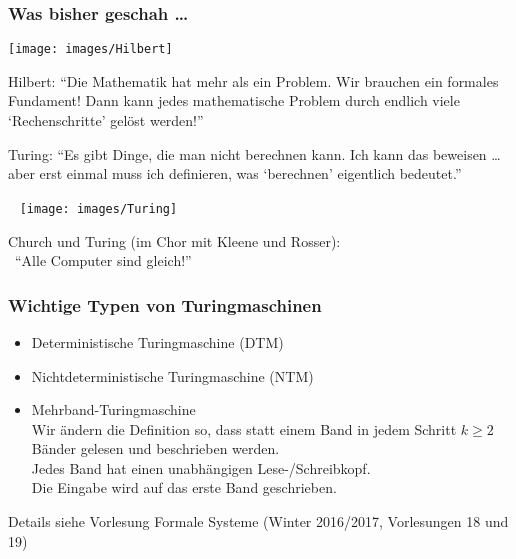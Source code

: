 \documentclass[onlymath]{beamer}
\begin{document}
\maketitle

\begin{frame}\frametitle{Was bisher geschah \ldots}\label{frame_hilbert}\label{frame_turing_child}

\begin{minipage}{2.3cm}
\texttt{[image: images/Hilbert]}
\end{minipage}
\begin{minipage}{7.5cm}
Hilbert: "`Die Mathematik hat mehr als ein Problem. Wir brauchen ein formales Fundament! Dann kann jedes mathematische Problem durch endlich viele `Rechenschritte' gelöst werden!"'
\end{minipage}

\bigskip

\begin{minipage}{7.3cm}
Turing: "`Es gibt Dinge, die man nicht berechnen kann. Ich kann das beweisen \ldots{} aber erst einmal muss ich definieren, was `berechnen' eigentlich bedeutet."'
\end{minipage}
\begin{minipage}{2.4cm}
~\hspace{4mm}
\texttt{[image: images/Turing]}
\end{minipage}

\bigskip

Church und Turing (im Chor mit Kleene und Rosser):\\~\hfill"`Alle Computer sind gleich!"'\hfill~

\end{frame}

\begin{frame}\frametitle{Wichtige Typen von Turingmaschinen}

\begin{itemize}
\item \alert{Deterministische Turingmaschine} (DTM)
\item \alert{Nichtdeterministische Turingmaschine} (NTM)
\item \alert{Mehrband-Turingmaschine}\\
	Wir ändern die Definition so, dass statt einem Band in jedem Schritt $k\geq 2$ Bänder gelesen
	und beschrieben werden.\\
	Jedes Band hat einen unabhängigen Lese-/Schreibkopf.\\
	Die Eingabe wird auf das erste Band geschrieben.
\end{itemize}


Details siehe Vorlesung Formale Systeme (Winter 2016/2017, Vorlesungen 18 und 19)

\end{frame}
\end{document}
